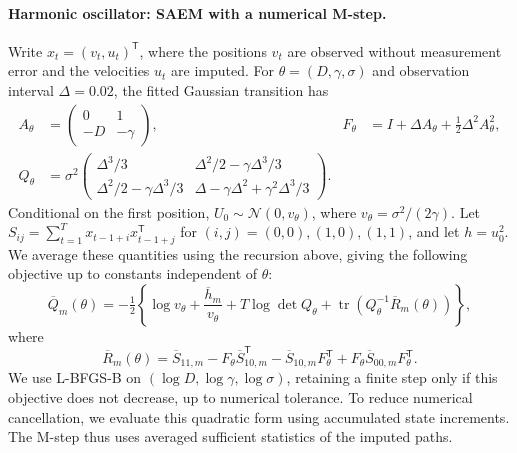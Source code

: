 \documentclass[11pt]{article}
\theoremstyle{thmstylethree}%
\begin{document}
\paragraph{Harmonic oscillator: SAEM with a numerical M-step.}
Write $x_t=(v_t,u_t)^\mathsf T$, where the positions $v_t$ are observed
without measurement error and the velocities $u_t$ are imputed.
For $\theta=(D,\gamma,\sigma)$ and observation interval $\Delta=0.02$,
the fitted Gaussian transition has
\begin{align*}
 A_\theta&=\begin{pmatrix}0&1\\-D&-\gamma\end{pmatrix},
 &F_\theta&=I+\Delta A_\theta+\tfrac12\Delta^2 A_\theta^2,\\
 Q_\theta&=\sigma^2
 \begin{pmatrix}
 \Delta^3/3&\Delta^2/2-\gamma\Delta^3/3\\
 \Delta^2/2-\gamma\Delta^3/3&
       \Delta-\gamma\Delta^2+\gamma^2\Delta^3/3
 \end{pmatrix}.
\end{align*}
Conditional on the first position, $U_0\sim\mathcal N(0,v_\theta)$,
where $v_\theta=\sigma^2/(2\gamma)$.
Let $S_{ij}=\sum_{t=1}^T x_{t-1+i}x_{t-1+j}^\mathsf T$ for
$(i,j)=(0,0),(1,0),(1,1)$, and let $h=u_0^2$.
We average these quantities using the recursion above, giving the
following objective up to constants independent of $\theta$:
\begin{equation}
 \overline Q_m(\theta)=-\tfrac12\left\{
  \log v_\theta+\frac{\overline h_m}{v_\theta}
  +T\log\det Q_\theta
  +\operatorname{tr}\!\left(Q_\theta^{-1}\overline R_m(\theta)\right)
 \right\},
 \label{eq:benchmark-oscillator-mstep}
\end{equation}
where
\[
 \overline R_m(\theta)=\overline S_{11,m}
     -F_\theta\overline S_{10,m}^{\mathsf T}
     -\overline S_{10,m}F_\theta^{\mathsf T}
     +F_\theta\overline S_{00,m}F_\theta^{\mathsf T}.
\]
We use L-BFGS-B on $(\log D,\log\gamma,\log\sigma)$, retaining a finite
step only if this objective does not decrease, up to numerical tolerance.
To reduce numerical cancellation, we evaluate this quadratic form using
accumulated state increments. The M-step thus uses averaged sufficient
statistics of the imputed paths.
\end{document}
